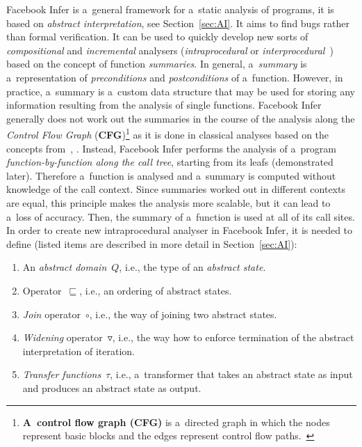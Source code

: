 Facebook Infer is a~general framework for a~static analysis of programs, it is
based on \emph{abstract interpretation}, see Section~\ref{sec:AI}. It aims
to find bugs rather than formal verification. It can be used to quickly develop
new sorts of \emph{compositional} and \emph{incremental} analysers
(\emph{intraprocedural} or
\emph{interprocedural}~\cite{programAnalysisNielson}) based
on the concept of function \emph{summaries}. In general, a~\emph{summary}
is a~representation of \emph{preconditions} and \emph{postconditions} of
a~function. However, in practice, a~summary is a~custom data structure that
may be used for storing any information resulting from the analysis of
single functions. Facebook Infer generally does not work out the summaries
in the course of the analysis along the \emph{Control Flow Graph}
(\textbf{CFG})\footnote{\textbf{A~control flow graph (CFG)} is a~directed
graph in which the nodes represent basic blocks and the edges represent control flow paths.~\cite{controlFlowAnalysisAllen}} as it is done in classical analyses
based on the concepts from~\cite{dataflowAnalysisGraphReachability},
\cite{dataflowAnalysisApproaches}. Instead, Facebook Infer performs the
analysis of a~program \emph{function-by-function along the call tree},
starting from its leafs (demonstrated later). Therefore a~function
is analysed and a~summary is computed without knowledge of the
call context. Since summaries worked out in different contexts are equal,
this principle makes the analysis more scalable, but it can lead to
a~loss of accuracy. Then, the summary of a~function is used at all of its
call sites. In order to create new intraprocedural analyser in Facebook
Infer, it is needed to define (listed items are described in more detail
in Section~\ref{sec:AI}):
\begin{enumerate}
    \item
        An \emph{abstract domain}~$ Q $, i.e., the type of an
        \emph{abstract state}.

    \item
        Operator~$ \sqsubseteq $, i.e., an ordering of abstract states.

    \item
        \emph{Join} operator~$ \circ $, i.e., the way of joining two abstract
        states.

    \item
        \emph{Widening} operator~$ \triangledown $, i.e., the way how to
        enforce termination of the abstract interpretation of iteration.

    \item
        \emph{Transfer functions}~$ \tau $, i.e., a~transformer that
        takes an abstract state as input and produces an abstract state
        as output.
\end{enumerate}
